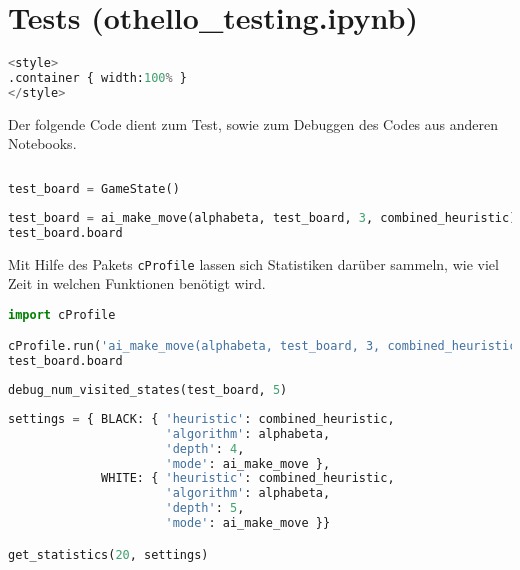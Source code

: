 \hypertarget{tests-othello_testing.ipynb}{%
\section{Tests
(othello\_testing.ipynb)}\label{tests-othello_testing.ipynb}}


\begin{lstlisting}[language=Python]
%%HTML
<style>
.container { width:100% }
</style>
\end{lstlisting}

Der folgende Code dient zum Test, sowie zum Debuggen des Codes aus
anderen Notebooks.

\begin{lstlisting}[language=Python]
%run othello_test_util.ipynb
\end{lstlisting}

\begin{lstlisting}[language=Python]
test_board = GameState()
\end{lstlisting}

\begin{lstlisting}[language=Python]
test_board = ai_make_move(alphabeta, test_board, 3, combined_heuristic)
test_board.board
\end{lstlisting}

Mit Hilfe des Pakets \passthrough{\lstinline!cProfile!} lassen sich
Statistiken darüber sammeln, wie viel Zeit in welchen Funktionen
benötigt wird.

\begin{lstlisting}[language=Python]
import cProfile

cProfile.run('ai_make_move(alphabeta, test_board, 3, combined_heuristic)')
test_board.board
\end{lstlisting}

\begin{lstlisting}[language=Python]
debug_num_visited_states(test_board, 5)
\end{lstlisting}

\begin{lstlisting}[language=Python]
settings = { BLACK: { 'heuristic': combined_heuristic,
                      'algorithm': alphabeta,
                      'depth': 4,
                      'mode': ai_make_move },
             WHITE: { 'heuristic': combined_heuristic,
                      'algorithm': alphabeta,
                      'depth': 5,
                      'mode': ai_make_move }}

get_statistics(20, settings)
\end{lstlisting}

